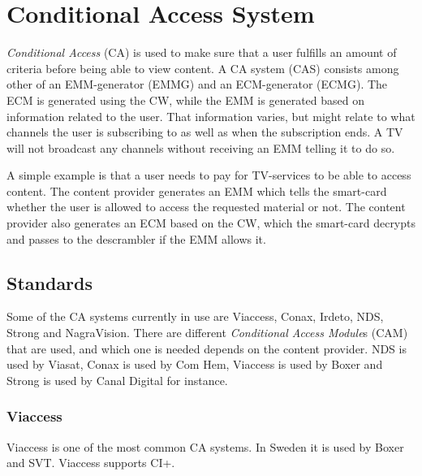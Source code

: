 \section{Conditional Access System} \label{sec:CAS}
\emph{Conditional Access} (CA) is used to make sure that a user fulfills an 
amount of criteria before being able to view content. A CA system (CAS) consists 
among other of an EMM-generator (EMMG) and an ECM-generator (ECMG). %
The ECM is generated using the CW, while the EMM is generated based on 
information related to the user. That information varies, but might relate to 
what channels the user is subscribing to as well as when the subscription ends. 
A TV will not broadcast any channels without receiving an EMM telling it to do 
so.

A simple example is that a user needs to pay for TV-services to be able to access
content. The content provider generates an EMM which tells the smart-card whether
the user is allowed to access the requested material or not. The content provider
also generates an ECM based on the CW, which the smart-card decrypts and passes 
to the descrambler if the EMM allows it.

\subsection{Standards}
Some of the CA systems currently in use are Viaccess, Conax, Irdeto, NDS, Strong 
and NagraVision. There are different \emph{Conditional Access Module}s (CAM) 
that are used, and which one is needed depends on the content provider. NDS is 
used by Viasat, Conax is used by Com Hem, Viaccess is used by Boxer and Strong 
is used by Canal Digital for instance.

\subsubsection{Viaccess}
Viaccess is one of the most common CA systems. In Sweden it is used by Boxer and SVT. Viaccess supports CI+.

